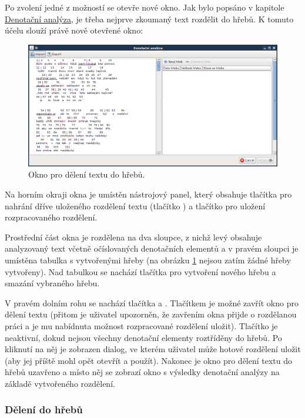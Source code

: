 \documentclass[dp.tex]{subfiles}
\begin{document}
Po zvolení jedné z možností se otevře nové okno. Jak bylo popsáno v kapitole \hyperref[chap:denotacni_analyza]{Denotační analýza}, je třeba nejprve zkoumaný text rozdělit do hřebů. K tomuto účelu slouží právě nově otevřené okno:
\begin{figure}[H]
\centering
\includegraphics[max width=\textwidth,keepaspectratio=true]{imgs-60-aplikace/gui-denotation-window}
\caption{Okno pro dělení textu do hřebů.}
\label{fig:gui-denotation-window}
\end{figure}

Na horním okraji okna je umístěn nástrojový panel, který obsahuje tlačítka pro nahrání dříve uloženého rozdělení textu (tlačítko ) a tlačítko  pro uložení rozpracovaného rozdělení. 

Prostřední část okna je rozdělena na dva sloupce, z nichž levý obsahuje analyzovaný text včetně očíslovaných denotačních elementů a v pravém sloupci je umístěna tabulka s vytvořenými hřeby (na obrázku \ref{fig:gui-denotation-window} nejsou zatím žádné hřeby vytvořeny). Nad tabulkou se nachází tlačítka pro vytvoření nového hřebu a smazání vybraného hřebu. 

V pravém dolním rohu se nachází tlačítka  a . Tlačítkem  je možné zavřít okno pro dělení textu (přitom je uživatel upozorněn, že zavřením okna přijde o rozdělanou práci a je mu nabídnuta možnost rozpracované rozdělení uložit). Tlačítko  je neaktivní, dokud nejsou všechny denotační elementy roztříděny do hřebů. Po kliknutí na něj je zobrazen dialog, ve kterém uživatel může hotové rozdělení uložit (aby jej příště mohl opět otevřít a použít). Nakonec je okno pro dělení textu do hřebů uzavřeno a místo něj se zobrazí okno s výsledky denotační analýzy na základě vytvořeného rozdělení.

\subsubsection{Dělení do hřebů}
\end{document}
